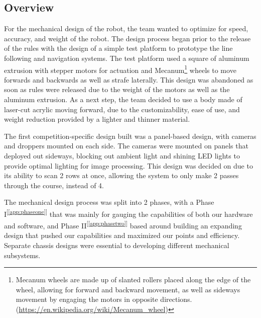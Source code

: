 \documentclass[11pt, hidelinks]{report}
\newcommand{\refapp}[1]{\textsuperscript{[\ref{#1}]}}
\begin{document}
\subsection{Overview}
For the mechanical design of the robot, the team wanted to optimize for speed, accuracy, and weight of the robot. The design process began prior to the release of the rules with the design of a simple test platform to prototype the line following and navigation systems. The test platform used a square of aluminum extrusion with stepper motors for actuation and Mecanum\footnote{Mecanum wheels are made up of slanted rollers placed along the edge of the wheel, allowing for forward and backward movement, as well as sideways movement by engaging the motors in opposite directions. (\url{https://en.wikipedia.org/wiki/Mecanum_wheel})} wheels to move forwards and backwards as well as strafe laterally.  This design was abandoned as soon as rules were released due to the weight of the motors as well as the aluminum extrusion.  As a next step, the team decided to use a body made of laser-cut acrylic moving forward, due to the customizability, ease of use, and weight reduction provided by a lighter and thinner material.

The first competition-specific design built was a panel-based design, with cameras and droppers mounted on each side.  The cameras were mounted on panels that deployed out sideways, blocking out ambient light and shining LED lights to provide optimal lighting for image processing. This design was decided on due to its ability to scan 2 rows at once, allowing the system to only make 2 passes through the course, instead of 4.  

The mechanical design process was split into 2 phases, with a Phase I\refapp{app:phaseone} that was mainly for gauging the capabilities of both our hardware and software, and Phase II\refapp{app:phasetwo} based around building an expanding design that pushed our capabilities and maximized our points and efficiency. Separate chassis designs were essential to developing different mechanical subsystems.
\end{document}
